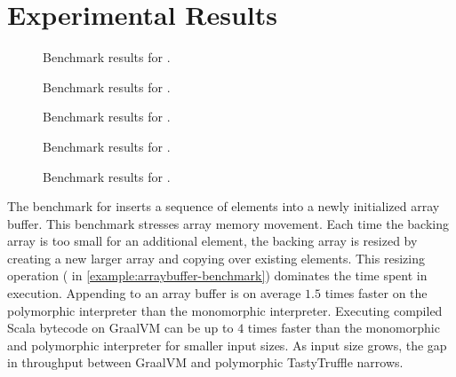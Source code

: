 \section{Experimental Results}

\begin{figure}
	\centering
	
	\caption{Benchmark results for .}
\end{figure}

\begin{figure}
	\centering
	
	\caption{Benchmark results for .}
\end{figure}

\begin{figure}
	\centering
	
	\caption{Benchmark results for .}
\end{figure}

\begin{figure}
	\centering
	
	\caption{Benchmark results for .}
\end{figure}

\begin{figure}
	\centering
	
	\caption{Benchmark results for .}
\end{figure}

The benchmark for  inserts a sequence of elements into a newly initialized array buffer. 
This benchmark stresses array memory movement.
Each time the backing array is too small for an additional element, the backing array is resized by creating a new larger array and copying over existing elements.
This resizing operation ( in \ref{example:arraybuffer-benchmark}) dominates the time spent in execution.
Appending to an array buffer is on average $1.5$ times faster on the polymorphic interpreter than the monomorphic interpreter.
Executing compiled Scala bytecode on GraalVM can be up to $4$ times faster than the monomorphic and polymorphic interpreter for smaller input sizes.
As input size grows, the gap in throughput between GraalVM and polymorphic TastyTruffle narrows.

